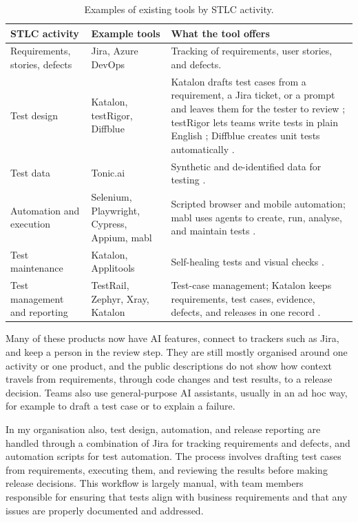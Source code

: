 \begin{table}[htbp]
\centering
\small
{}
\begin{tabularx}{\textwidth}{>{\raggedright\arraybackslash}p{}>{\raggedright\arraybackslash}p{}>{\raggedright\arraybackslash}X}
\toprule
\textbf{STLC activity} & \textbf{Example tools} & \textbf{What the tool offers} \\
\midrule
Requirements, stories, defects & Jira, Azure DevOps & Tracking of requirements, user stories, and defects. \\
Test design & Katalon, testRigor, Diffblue & Katalon drafts test cases from a requirement, a Jira ticket, or a prompt and leaves them for the tester to review \cite{katalon2026}; testRigor lets teams write tests in plain English \cite{testrigor2026}; Diffblue creates unit tests automatically \cite{diffblue2026}. \\
Test data & Tonic.ai & Synthetic and de-identified data for testing \cite{tonic2026}. \\
Automation and execution & Selenium, Playwright, Cypress, Appium, mabl & Scripted browser and mobile automation; mabl uses agents to create, run, analyse, and maintain tests \cite{mabl2026}. \\
Test maintenance & Katalon, Applitools & Self-healing tests and visual checks \cite{katalon2026,applitools2026}. \\
Test management and reporting & TestRail, Zephyr, Xray, Katalon & Test-case management; Katalon keeps requirements, test cases, evidence, defects, and releases in one record \cite{katalon2026}. \\
\bottomrule
\end{tabularx}
\caption{Examples of existing tools by STLC activity.}
\label{tab:existing-practices}
\end{table}

Many of these products now have AI features, connect to trackers such as Jira, and keep a person in the review step. They are still mostly organised around one activity or one product, and the public descriptions do not show how context travels from requirements, through code changes and test results, to a release decision. Teams also use general-purpose AI assistants, usually in an ad hoc way, for example to draft a test case or to explain a failure.

In my organisation also, test design, automation, and release reporting are handled through a combination of Jira for tracking requirements and defects, and automation scripts for test automation. The process involves drafting test cases from requirements, executing them, and reviewing the results before making release decisions. This workflow is largely manual, with team members responsible for ensuring that tests align with business requirements and that any issues are properly documented and addressed.

